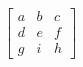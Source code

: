 \[ \left[ \begin{array}{ccc}
    a & b & c \\
    d & e & f \\
    g & i & h
\end{array} \right] \]
